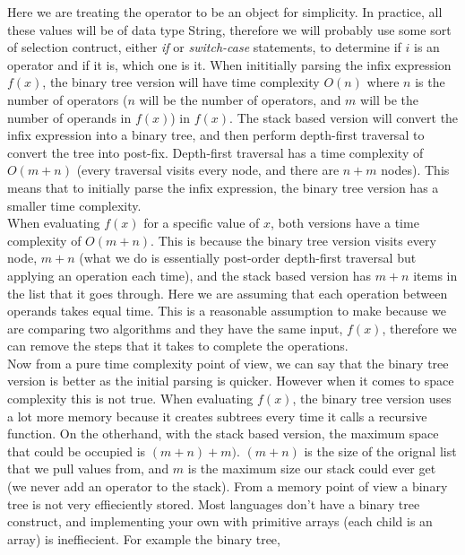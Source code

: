 \documentclass{report}
\newcounter{subsubsubsection}[subsubsection]
\begin{document}
Here we are treating the operator to be an object for simplicity. In practice, all these values will be of data type String, therefore we will probably use some sort of selection contruct, either \textit{if} or \textit{switch-case} statements, to determine if $i$ is an operator and if it is, which one is it.
\newpage
{}
When inititially parsing the infix expression $f(x)$, the binary tree version will have time complexity $O(n)$ where $n$ is the number of operators ($n$ will be the number of operators, and $m$ will be the number of operands in $f(x)$) in $f(x)$. The stack based version will convert the infix expression into a binary tree, and then perform depth-first traversal to convert the tree into post-fix. Depth-first traversal has a time complexity of $O(m+n)$ (every traversal visits every node, and there are $n+m$ nodes). This means that to initially parse the infix expression, the binary tree version has a smaller time complexity.\\
When evaluating $f(x)$ for a specific value of $x$, both versions have a time complexity of $O(m+n)$. This is because the binary tree version visits every node, $m+n$ (what we do is essentially post-order depth-first traversal but applying an operation each time), and the stack based version has $m+n$ items in the list that it goes through. Here we are assuming that each operation between operands takes equal time. This is a reasonable assumption to make because we are comparing two algorithms and they have the same input, $f(x)$, therefore we can remove the steps that it takes to complete the operations.\\
Now from a pure time complexity point of view, we can say that the binary tree version is better as the initial parsing is quicker. However when it comes to space complexity this is not true. When evaluating $f(x)$, the binary tree version uses a lot more memory because it creates subtrees every time it calls a recursive function. On the otherhand, with the stack based version, the maximum space that could be occupied is $(m+n) + m)$. $(m+n)$ is the size of the orignal list that we pull values from, and $m$ is the maximum size our stack could ever get (we never add an operator to the stack). From a memory point of view a binary tree is not very effieciently stored. Most languages don't have a binary tree construct, and implementing your own with primitive arrays (each child is an array) is ineffiecient. For example the binary tree,\\
\par
\end{document}
